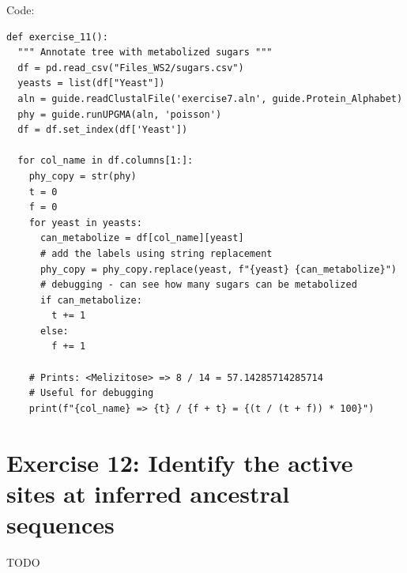 \documentclass{article} %
\begin{document}
Code:

\begin{verbatim}
def exercise_11():
  """ Annotate tree with metabolized sugars """
  df = pd.read_csv("Files_WS2/sugars.csv")
  yeasts = list(df["Yeast"])                        
  aln = guide.readClustalFile('exercise7.aln', guide.Protein_Alphabet)
  phy = guide.runUPGMA(aln, 'poisson')
  df = df.set_index(df['Yeast'])

  for col_name in df.columns[1:]:
    phy_copy = str(phy)
    t = 0
    f = 0
    for yeast in yeasts:
      can_metabolize = df[col_name][yeast]
      # add the labels using string replacement
      phy_copy = phy_copy.replace(yeast, f"{yeast} {can_metabolize}")
      # debugging - can see how many sugars can be metabolized
      if can_metabolize: 
        t += 1
      else:
        f += 1

    # Prints: <Melizitose> => 8 / 14 = 57.14285714285714
    # Useful for debugging
    print(f"{col_name} => {t} / {f + t} = {(t / (t + f)) * 100}")
\end{verbatim}

\section{Exercise 12: Identify the active sites at inferred ancestral sequences}

TODO
\end{document}
